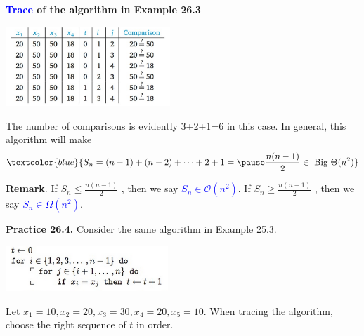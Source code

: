 \documentclass[aspectratio=169]{beamer}
\providecommand{\Blue}[1]{\textcolor{blue}{#1}}
\begin{document}
\begin{frame}[plain]{}
 
 \begin{center}
   {\bf \Blue{Trace} of the algorithm in Example 26.3}\\ 
    \smallskip 
    
   \includegraphics[height=3cm]{./img/lecture26-fig5.png}
 \end{center}
 
 The number of comparisons is evidently  3+2+1=6 in this case. In general, this algorithm will make
 \[ \Blue{ S_n = (n-1)+(n-2)+\cdots +2+1 = \pause  \frac{n(n-1)}{2} \in \ 
     \mbox{Big-}\Theta(n^2) } \]
     
  {\bf Remark}. If $S_n \leq \frac{n(n-1)}{2}$ , then we say \Blue{$S_n\in \mathcal{O}(n^2)$}.
  If $S_n \geq \frac{n(n-1)}{2}$ , then we say \Blue{$S_n\in \Omega(n^2)$}.
 
 \end{frame}
 
 \begin{frame}[plain]{}
 
 {\bf Practice 26.4.}  Consider the same algorithm in Example 25.3.
 \begin{center}
			\includegraphics[height=1.7cm]{./img/lecture26-fig4.png} 
		\end{center}
 
  Let $x_1=10, x_2=20, x_3=30, x_4=20, x_5=10$. When tracing the algorithm, 
  choose the right sequence of $t$ in order. 
 
 \vspace{1in}
  
\end{frame}
\end{document}
